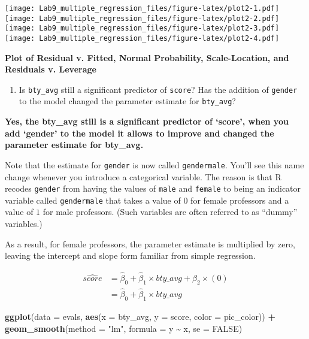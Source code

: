 \documentclass[
]{article}
\newenvironment{Shaded}{\begin{snugshade}}{\end{snugshade}}
\newcommand{\AttributeTok}[1]{\textcolor[rgb]{0.13,0.29,0.53}{#1}}
\newcommand{\ConstantTok}[1]{\textcolor[rgb]{0.56,0.35,0.01}{#1}}
\newcommand{\FunctionTok}[1]{\textcolor[rgb]{0.13,0.29,0.53}{\textbf{#1}}}
\newcommand{\NormalTok}[1]{#1}
\newcommand{\SpecialCharTok}[1]{\textcolor[rgb]{0.81,0.36,0.00}{\textbf{#1}}}
\newcommand{\StringTok}[1]{\textcolor[rgb]{0.31,0.60,0.02}{#1}}
\providecommand{\tightlist}{%
  \setlength{\itemsep}{0pt}\setlength{\parskip}{0pt}}
\begin{document}
\texttt{[image: Lab9\_multiple\_regression\_files/figure-latex/plot2-1.pdf]}
\texttt{[image: Lab9\_multiple\_regression\_files/figure-latex/plot2-2.pdf]}
\texttt{[image: Lab9\_multiple\_regression\_files/figure-latex/plot2-3.pdf]}
\texttt{[image: Lab9\_multiple\_regression\_files/figure-latex/plot2-4.pdf]}

\textbf{Plot of Residual v. Fitted, Normal Probability, Scale-Location,
and Residuals v. Leverage}

\begin{enumerate}
\def\labelenumi{\arabic{enumi}.}
\setcounter{enumi}{7}
\tightlist
\item
  Is \texttt{bty\_avg} still a significant predictor of \texttt{score}?
  Has the addition of \texttt{gender} to the model changed the parameter
  estimate for \texttt{bty\_avg}?
\end{enumerate}

\textbf{Yes, the bty\_avg still is a significant predictor of `score',
when you add `gender' to the model it allows to improve and changed the
parameter estimate for bty\_avg.}

Note that the estimate for \texttt{gender} is now called
\texttt{gendermale}. You'll see this name change whenever you introduce
a categorical variable. The reason is that R recodes \texttt{gender}
from having the values of \texttt{male} and \texttt{female} to being an
indicator variable called \texttt{gendermale} that takes a value of
\(0\) for female professors and a value of \(1\) for male professors.
(Such variables are often referred to as ``dummy'' variables.)

As a result, for female professors, the parameter estimate is multiplied
by zero, leaving the intercept and slope form familiar from simple
regression.

\[
  \begin{aligned}
\widehat{score} &= \hat{\beta}_0 + \hat{\beta}_1 \times bty\_avg + \hat{\beta}_2 \times (0) \\
&= \hat{\beta}_0 + \hat{\beta}_1 \times bty\_avg\end{aligned}
\]

\begin{Shaded}
\begin{Highlighting}[]
\FunctionTok{ggplot}\NormalTok{(}\AttributeTok{data =}\NormalTok{ evals, }\FunctionTok{aes}\NormalTok{(}\AttributeTok{x =}\NormalTok{ bty\_avg, }\AttributeTok{y =}\NormalTok{ score, }\AttributeTok{color =}\NormalTok{ pic\_color)) }\SpecialCharTok{+}
 \FunctionTok{geom\_smooth}\NormalTok{(}\AttributeTok{method =} \StringTok{"lm"}\NormalTok{, }\AttributeTok{formula =}\NormalTok{ y }\SpecialCharTok{\textasciitilde{}}\NormalTok{ x, }\AttributeTok{se =} \ConstantTok{FALSE}\NormalTok{)}
\end{Highlighting}
\end{Shaded}
\end{document}
